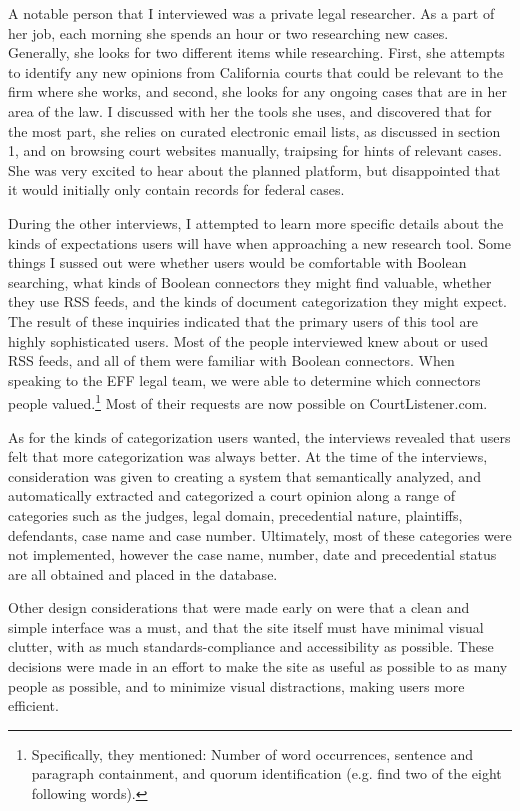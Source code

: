A notable person that I interviewed was a private legal researcher. As a part of her job, each morning she spends an hour or two researching new cases. Generally, she looks for two different items while researching. First, she attempts to identify any new opinions from California courts that could be relevant to the firm where she works, and second, she looks for any ongoing cases that are in her area of the law. I discussed with her the tools she uses, and discovered that for the most part, she relies on curated electronic email lists, as discussed in section 1, and on browsing court websites manually, traipsing for hints of relevant cases. She was very excited to hear about the planned platform, but disappointed that it would initially only contain records for federal cases.

During the other interviews, I attempted to learn more specific details about the kinds of expectations users will have when approaching a new research tool. Some things I sussed out were whether users would be comfortable with Boolean searching, what kinds of Boolean connectors they might find valuable, whether they use RSS feeds, and the kinds of document categorization they might expect. The result of these inquiries indicated that the primary users of this tool are highly sophisticated users. Most of the people interviewed knew about or used RSS feeds, and all of them were familiar with Boolean connectors. When speaking to the EFF legal team, we were able to determine which connectors people valued.\footnote{Specifically, they mentioned: Number of word occurrences, sentence and paragraph containment, and quorum identification (e.g. find two of the eight following words).} Most of their requests are now possible on CourtListener.com.

As for the kinds of categorization users wanted, the interviews revealed that users felt that more categorization was always better. At the time of the interviews, consideration was given to creating a system that semantically analyzed, and automatically extracted and categorized a court opinion along a range of categories such as the judges, legal domain, precedential nature, plaintiffs, defendants, case name and case number. Ultimately, most of these categories were not implemented, however the case name, number, date and precedential status are all obtained and placed in the database.

Other design considerations that were made early on were that a clean and simple interface was a must, and that the site itself must have minimal visual clutter, with as much standards-compliance and accessibility as possible. These decisions were made in an effort to make the site as useful as possible to as many people as possible, and to minimize visual distractions, making users more efficient.

